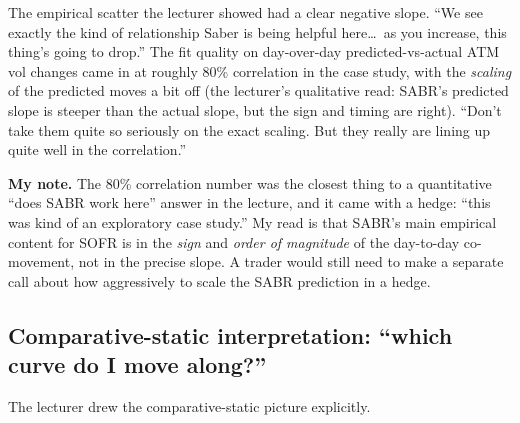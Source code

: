 The empirical scatter the lecturer showed had a clear negative
slope. ``We see exactly the kind of relationship Saber is being
helpful here\ldots\ as you increase, this thing's going to drop.''
The fit quality on day-over-day predicted-vs-actual ATM vol changes
came in at roughly $80\%$ correlation in the case study, with the
\emph{scaling} of the predicted moves a bit off (the lecturer's
qualitative read: SABR's predicted slope is steeper than the actual
slope, but the sign and timing are right). ``Don't take them quite
so seriously on the exact scaling. But they really are lining up
quite well in the correlation.''

\begin{checkpoint}
\textbf{My note.} The 80\% correlation number was the closest thing
to a quantitative ``does SABR work here'' answer in the lecture, and
it came with a hedge: ``this was kind of an exploratory case
study.'' My read is that SABR's main empirical content for SOFR is
in the \emph{sign} and \emph{order of magnitude} of the day-to-day
co-movement, not in the precise slope. A trader would still need to
make a separate call about how aggressively to scale the SABR
prediction in a hedge.
\end{checkpoint}

\subsection{Comparative-static interpretation: ``which curve do I move along?''}\label{L8-sec:compstat}

The lecturer drew the comparative-static picture explicitly.

